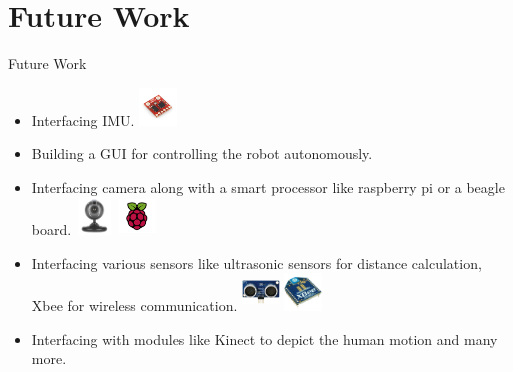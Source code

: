 \documentclass{beamer}
\begin{document}
\section{Future Work}

\begin{frame}{Future Work}
  \begin{itemize}
  
  \item Interfacing IMU. \includegraphics[width=1cm,height=1cm]{imu}
  \item Building a GUI for controlling the robot autonomously.
  \item Interfacing camera along with a smart processor like raspberry pi or a beagle board.
  \includegraphics[width=1cm,height=1cm]{Camera}
  \includegraphics[width=1cm,height=1cm]{Raspi}
  \item Interfacing various sensors like ultrasonic sensors for distance calculation,
  Xbee for wireless communication.
  \includegraphics[width=1cm,height=1cm]{ultrasonic}
  \includegraphics[width=1cm,height=1cm]{XBee-Pro}
  \item Interfacing with modules like Kinect to depict the human motion and many more.
  \end{itemize}
  
  
\end{frame}



\end{document}
